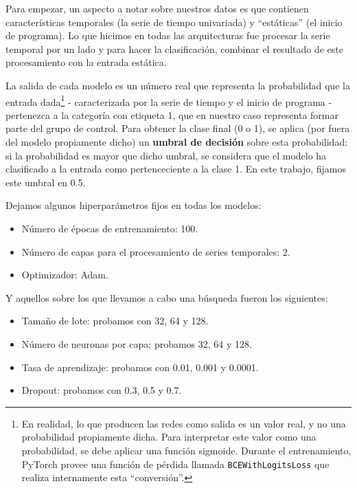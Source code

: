 \documentclass[../../main.tex]{subfiles}
\begin{document}
Para empezar, un aspecto a notar sobre nuestros datos es que contienen características
temporales (la serie de tiempo univariada) y ``estáticas'' (el inicio de programa). Lo que
hicimos en todas las arquitecturas fue procesar la serie temporal por un lado y para hacer
la clasificación, combinar el resultado de este procesamiento con la entrada estática.

La salida de cada modelo es un número real que representa la probabilidad que la entrada
dada\footnote{En realidad, lo que producen las redes como salida es un valor real, y no
una probabilidad propiamente dicha. Para interpretar este valor como una probabilidad, se
debe aplicar una función sigmoide. Durante el entrenamiento, PyTorch provee una función de
pérdida llamada \texttt{BCEWithLogitsLoss}\cite{bcewithlogitsloss} que realiza
internamente esta ``conversión''.} - caracterizada por la serie de tiempo y el inicio de
programa - pertenezca a la categoría con etiqueta 1, que en nuestro caso representa formar
parte del grupo de control. Para obtener la clase final (0 o 1), se aplica (por fuera del
modelo propiamente dicho) un \textbf{umbral de decisión} sobre esta probabilidad: si la
probabilidad es mayor que dicho umbral, se considera que el modelo ha clasificado a la
entrada como pertenceciente a la clase 1. En este trabajo, fijamos este umbral en 0.5.

Dejamos algunos hiperparámetros fijos en todas los modelos:
\begin{itemize}[itemsep=0cm, topsep=0cm, parsep=0cm, partopsep=0cm]
    \item Número de épocas de entrenamiento: 100.
    \item Número de capas para el procesamiento de series temporales: 2.
    \item Optimizador: Adam.
\end{itemize}

Y aquellos sobre los que llevamos a cabo una búsqueda fueron los siguientes:
\begin{itemize}[itemsep=0cm, topsep=0cm, parsep=0cm, partopsep=0cm]
    \item Tamaño de lote: probamos con 32, 64 y 128.
    \item Número de neuronas por capa: probamos 32, 64 y 128.
    \item Tasa de aprendizaje: probamos con 0.01, 0.001 y 0.0001.
    \item Dropout: probamos con 0.3, 0.5 y 0.7.
\end{itemize}
\end{document}
